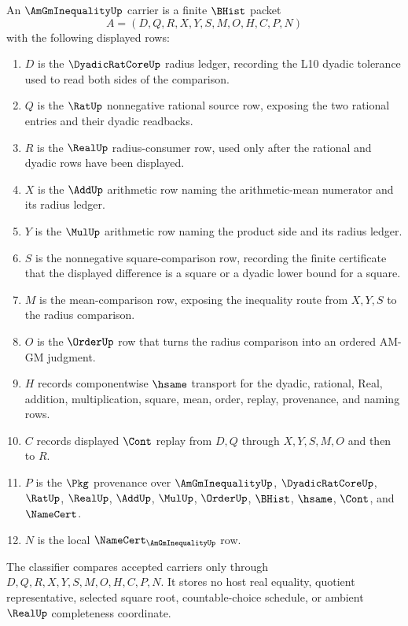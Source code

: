 \begin{definition}
\label{def:am-gm-inequality-carrier}
An $\AmGmInequalityUp$ carrier is a finite $\BHist$ packet
$$
A=(D,Q,R,X,Y,S,M,O,H,C,P,N)
$$
with the following displayed rows:
\begin{enumerate}
\item $D$ is the $\DyadicRatCoreUp$ radius ledger, recording the L10 dyadic tolerance used to read both sides of the comparison.
\item $Q$ is the $\RatUp$ nonnegative rational source row, exposing the two rational entries and their dyadic readbacks.
\item $R$ is the $\RealUp$ radius-consumer row, used only after the rational and dyadic rows have been displayed.
\item $X$ is the $\AddUp$ arithmetic row naming the arithmetic-mean numerator and its radius ledger.
\item $Y$ is the $\MulUp$ arithmetic row naming the product side and its radius ledger.
\item $S$ is the nonnegative square-comparison row, recording the finite certificate that the displayed difference is a square or a dyadic lower bound for a square.
\item $M$ is the mean-comparison row, exposing the inequality route from $X,Y,S$ to the radius comparison.
\item $O$ is the $\OrderUp$ row that turns the radius comparison into an ordered AM-GM judgment.
\item $H$ records componentwise $\hsame$ transport for the dyadic, rational, Real, addition, multiplication, square, mean, order, replay, provenance, and naming rows.
\item $C$ records displayed $\Cont$ replay from $D,Q$ through $X,Y,S,M,O$ and then to $R$.
\item $P$ is the $\Pkg$ provenance over $\AmGmInequalityUp$, $\DyadicRatCoreUp$, $\RatUp$, $\RealUp$, $\AddUp$, $\MulUp$, $\OrderUp$, $\BHist$, $\hsame$, $\Cont$, and $\NameCert$.
\item $N$ is the local $\NameCert_{\AmGmInequalityUp}$ row.
\end{enumerate}
The classifier compares accepted carriers only through $D,Q,R,X,Y,S,M,O,H,C,P,N$. It stores no host real equality, quotient representative, selected square root, countable-choice schedule, or ambient $\RealUp$ completeness coordinate.
\end{definition}

